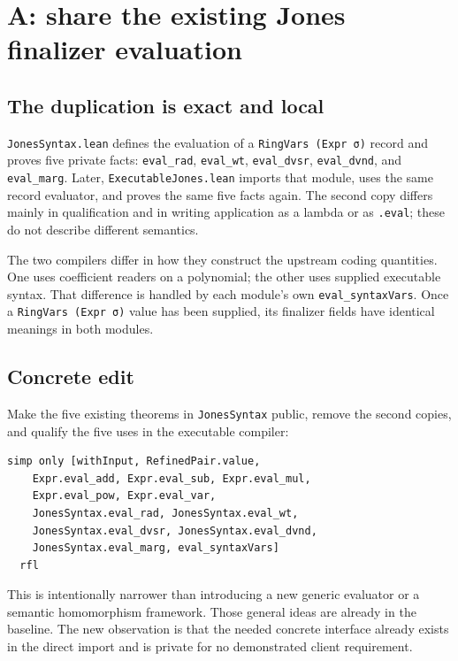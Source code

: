 \documentclass[11pt,letterpaper]{article}
\newcommand{\code}[1]{{\small\nolinkurl{#1}}}
\begin{document}
\section{A: share the existing Jones finalizer evaluation}
\label{sec:share}

\subsection{The duplication is exact and local}

\code{JonesSyntax.lean} defines the evaluation of a \code{RingVars (Expr σ)} record and proves five private facts:
\code{eval_rad}, \code{eval_wt}, \code{eval_dvsr}, \code{eval_dvnd}, and \code{eval_marg}. Later, \code{ExecutableJones.lean} imports that module, uses the same record evaluator, and proves the same five facts again. The second copy differs mainly in qualification and in writing application as a lambda or as \code{.eval}; these do not describe different semantics.\cite{jones,execjones}

The two compilers differ in how they construct the upstream coding quantities. One uses coefficient readers on a polynomial; the other uses supplied executable syntax. That difference is handled by each module's own \code{eval_syntaxVars}. Once a \code{RingVars (Expr σ)} value has been supplied, its finalizer fields have identical meanings in both modules.

\subsection{Concrete edit}

Make the five existing theorems in \code{JonesSyntax} public, remove the second copies, and qualify the five uses in the executable compiler:

\begin{Verbatim}[fontsize=\small,breaklines=true,samepage=true]
  simp only [withInput, RefinedPair.value,
    Expr.eval_add, Expr.eval_sub, Expr.eval_mul,
    Expr.eval_pow, Expr.eval_var,
    JonesSyntax.eval_rad, JonesSyntax.eval_wt,
    JonesSyntax.eval_dvsr, JonesSyntax.eval_dvnd,
    JonesSyntax.eval_marg, eval_syntaxVars]
  rfl
\end{Verbatim}

This is intentionally narrower than introducing a new generic evaluator or a semantic homomorphism framework. Those general ideas are already in the baseline. The new observation is that the needed concrete interface already exists in the direct import and is private for no demonstrated client requirement.
\end{document}
